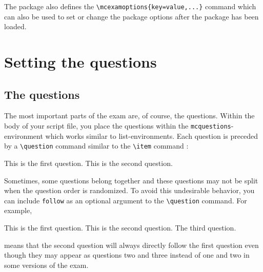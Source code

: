 \documentclass{article}
\begin{document}
The package also defines the \verb$\mcexamoptions{key=value,...}$ command which can also be used to set or change the package options after the package has been loaded.




















\section{Setting the questions}


\subsection{The questions}

The most important parts of the exam are, of course, the questions. Within the body of your script file, you place the questions within the \verb$mcquestions$-environment which works similar to list-environments. Each question is preceded by a \verb$\question$ command similar to the \verb$\item$ command :
\begin{code}
\begin{mcquestions}
\question This is the first question.
\question This is the second question.
\end{mcquestions}
\end{code}

Sometimes, some questions belong together and these questions may not be split when the question order is randomized. To avoid this undesirable behavior, you can include \verb$follow$ as an optional argument to the \verb$\question$ command. For example, 
\begin{code}
\begin{mcquestions}
\question This is the first question.
\question[follow] This is the second question.
\question The third question.
\end{mcquestions}
\end{code}
means that the second question will always directly follow the first question even though they may appear as questions two and three instead of one and two in some versions of the exam.
\end{document}

